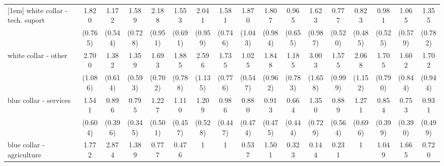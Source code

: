 {\begin{tabular}{l*{16}{c}}
[1em]
white collar - tech. suport&       1.820         &       1.172         &       1.589         &       2.188         &       1.553         &       2.041         &       1.581         &       1.870         &       1.807         &       0.965         &       1.623         &       0.777         &       0.823         &       0.981         &       1.065         &       1.355         \\
                    &     (0.765)         &     (0.544)         &     (0.728)         &     (0.951)         &     (0.691)         &     (0.959)         &     (0.746)         &     (1.043)         &     (0.984)         &     (0.655)         &     (0.987)         &     (0.520)         &     (0.485)         &     (0.525)         &     (0.579)         &     (0.782)         \\
[1em]
white collar - other&       2.700\sym{*}  &       1.382         &       1.359         &       1.693         &       1.885         &       2.596\sym{*}  &       1.735         &       1.025         &       1.848         &       1.185         &       3.003\sym{*}  &       1.575         &       2.068         &       1.705         &       1.602         &       1.702         \\
                    &     (1.086)         &     (0.614)         &     (0.593)         &     (0.702)         &     (0.788)         &     (1.135)         &     (0.776)         &     (0.547)         &     (0.962)         &     (0.783)         &     (1.658)         &     (0.999)         &     (1.152)         &     (0.790)         &     (0.844)         &     (0.944)         \\
[1em]
blue collar - services&       1.541         &       0.896         &       0.795         &       1.227         &       1.110         &       1.209         &       0.986         &       0.880         &       0.913         &       0.664         &       1.350         &       0.889         &       1.271         &       0.854         &       0.753         &       0.931         \\
                    &     (0.604)         &     (0.396)         &     (0.345)         &     (0.501)         &     (0.457)         &     (0.528)         &     (0.447)         &     (0.474)         &     (0.475)         &     (0.444)         &     (0.729)         &     (0.564)         &     (0.696)         &     (0.399)         &     (0.390)         &     (0.499)         \\
[1em]
blue collar - agriculture&       1.772         &       2.874         &       1.389         &       0.777         &       0.476         &           1         &           1         &       0.537         &       1.501         &       0.323         &       0.144         &       0.231         &           1         &       1.049         &       1.665         &       0.720         \\

\end{tabular}}

